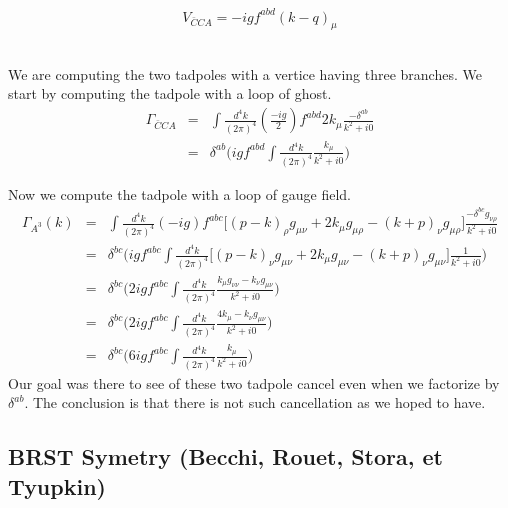 \documentclass[a4paper,11pt]{article} %
\numberwithin{equation}{section} %
\numberwithin{figure}{section} %
\theoremstyle{plain} %
\theoremstyle{definition} %
\theoremstyle{remark} %
\begin{document}
\begin{minipage}[c]{0.45\linewidth}
 \begin{equation*}
  V_{\bar{C} C A} = -igf^{abd} (k-q)_{\mu} 
 \end{equation*}
\end{minipage} \hfill
\begin{minipage}[c]{0.45\linewidth}
 \begin{center}
 \end{center}
\end{minipage}\\

\noindent
We are computing the two tadpoles with a vertice having three branches. We start by computing the tadpole with a loop of ghost.
\begin{eqnarray*}
 \Gamma_{\bar{C} C A} &=& \int \frac{d^4k}{(2 \pi)^4} \left(\frac{-ig}{2}\right) f^{abd} 2 k_{\mu} \frac{- \delta^{ab}}{k^2+i0} \\
                          &=& \delta^{ab}  \Bigg( igf^{abd} \int \frac{d^4k}{(2 \pi)^4} \frac{ k_{\mu} }{ k^2+i0 }  \Bigg)
\end{eqnarray*}

\noindent
Now we compute the tadpole with a loop of gauge field.
\begin{eqnarray*}
 \Gamma_{A^3} (k) &=& \int \frac{d^4k}{(2 \pi)^4} (-ig) f^{abc} \Big[ (p-k)_{\rho} g_{\mu \nu} + 2k_{\mu} g_{\mu \rho} - (k+p)_{\nu} g_{\mu \rho} \Big] \frac{-\delta^{bc} g_{\nu \rho}}{k^2 + i0} \\
                  &=& \delta^{bc} \Bigg( igf^{abc} \int \frac{d^4k}{(2 \pi)^4} \Big[ (p-k)_{\nu} g_{\mu \nu} + 2k_{\mu} g_{\mu \nu} - (k+p)_{\nu} g_{\mu \nu} \Big] \frac{1}{k^2 + i0} \Bigg) \\
                  &=& \delta^{bc} \Bigg( 2igf^{abc} \int \frac{d^4k}{(2 \pi)^4} \frac{k_{\mu} g_{\nu \nu} - k_{\nu} g_{\mu \nu}}{k^2 + i0} \Bigg) \\
                  &=& \delta^{bc} \Bigg( 2igf^{abc} \int \frac{d^4k}{(2 \pi)^4} \frac{4 k_{\mu} - k_{\nu} g_{\mu \nu}}{k^2 + i0} \Bigg) \\
                  &=& \delta^{bc} \Bigg( 6igf^{abc} \int \frac{d^4k}{(2 \pi)^4} \frac{k_{\mu}}{k^2 + i0} \Bigg)
\end{eqnarray*}
Our goal was there to see of these two tadpole cancel even when we factorize by $\delta^{ab}$. The conclusion is that there is not such cancellation as we hoped to have.

\subsection*{BRST Symetry (Becchi, Rouet, Stora, et Tyupkin)}
\end{document}
